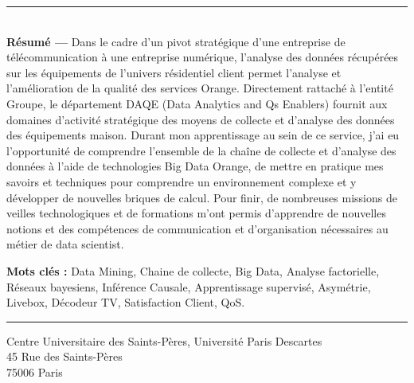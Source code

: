 
\vspace*{2.5cm}
\noindent\rule[2pt]{\textwidth}{0.5pt}\\
{\textbf{Résumé ---}}
Dans le cadre d’un pivot stratégique d’une entreprise de télécommunication à une entreprise numérique, l’analyse des données récupérées sur les équipements de l’univers résidentiel client permet l’analyse et l’amélioration de la qualité des services Orange. Directement rattaché à l’entité Groupe, le département DAQE (Data Analytics and Qs Enablers) fournit aux domaines d'activité stratégique des moyens de collecte et d’analyse des données des équipements maison. Durant mon apprentissage au sein de ce service, j’ai eu l’opportunité de comprendre l’ensemble de la chaîne de collecte et d’analyse des données à l'aide de technologies Big Data Orange, de mettre en pratique mes savoirs et techniques pour comprendre un environnement complexe et y développer de nouvelles briques de calcul. Pour finir, de nombreuses missions de veilles technologiques et de formations m’ont permis d’apprendre de nouvelles notions et des compétences de communication et d’organisation nécessaires au métier de data scientist.


{\textbf{Mots clés :}}
Data Mining, Chaine de collecte, Big Data, Analyse factorielle, Réseaux bayesiens, Inférence Causale, Apprentissage supervisé, Asymétrie, Livebox, Décodeur TV, Satisfaction Client, QoS.
\\
\noindent\rule[2pt]{\textwidth}{0.5pt}
\begin{center}
  Centre Universitaire des Saints-Pères, Université Paris Descartes \\
  45 Rue des Saints-Pères\\
  75006 Paris
\end{center}

